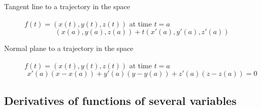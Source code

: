 \begin{multicols}{2}
	\begin{tcolorbox}[hbox, title=Tangent line and normal plane in the space]
		\begin{minipage}{0.4\textwidth}
			\flushleft
			\begin{description}
				\item[Tangent line to a trajectory in the space] \mbox{$f(t)=(x(t),y(t),z(t))$} at time $t=a$
				      \[
					      (x(a),y(a),z(a))+t(x'(a),y'(a),z'(a))
				      \]
				\item[Normal plane to a trajectory in the space] \mbox{$f(t)=(x(t),y(t),z(t))$} at time $t=a$
				      \[
					      x'(a)(x-x(a))+y'(a)(y-y(a))+z'(a)(z-z(a))=0
				      \]
			\end{description}
		\end{minipage}
	\end{tcolorbox}



\subsection*{Derivatives of functions of several variables}


\end{multicols}
